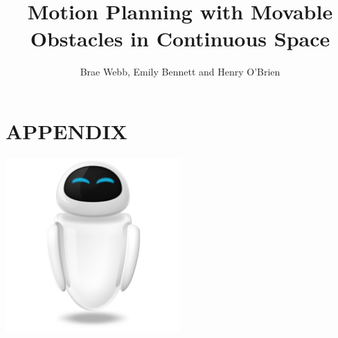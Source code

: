 \documentclass[a4paper, 10pt, conference]{IEEEtran}
\title{\LARGE \bf
Motion Planning with Movable Obstacles in Continuous Space
}
\author{Brae Webb, Emily Bennett and Henry O'Brien}
\begin{document}
\maketitle
\thispagestyle{empty}
\pagestyle{empty}








\section*{APPENDIX}
\includegraphics[width=0.5\textwidth]{../logo.png}


\end{document}
